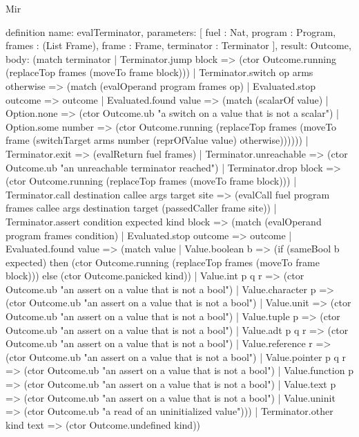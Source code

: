 \begin{lexlean}{Mir}
\begin{semanticmodule}
definition{
  name: evalTerminator,
  parameters: [
    fuel : Nat,
    program : Program,
    frames : (List Frame),
    frame : Frame,
    terminator : Terminator
  ],
  result: Outcome,
  body: (match terminator
    | Terminator.jump block => (ctor Outcome.running (replaceTop frames (moveTo frame block)))
    | Terminator.switch op arms otherwise => (match (evalOperand program frames op)
      | Evaluated.stop outcome => outcome
      | Evaluated.found value => (match (scalarOf value)
        | Option.none => (ctor Outcome.ub "a switch on a value that is not a scalar")
        | Option.some number => (ctor Outcome.running (replaceTop frames (moveTo frame (switchTarget arms number (reprOfValue value) otherwise))))))
    | Terminator.exit => (evalReturn fuel frames)
    | Terminator.unreachable => (ctor Outcome.ub "an unreachable terminator reached")
    | Terminator.drop block => (ctor Outcome.running (replaceTop frames (moveTo frame block)))
    | Terminator.call destination callee args target site => (evalCall fuel program frames callee args destination target (passedCaller frame site))
    | Terminator.assert condition expected kind block => (match (evalOperand program frames condition)
      | Evaluated.stop outcome => outcome
      | Evaluated.found value => (match value
        | Value.boolean b => (if (sameBool b expected) then (ctor Outcome.running (replaceTop frames (moveTo frame block))) else (ctor Outcome.panicked kind))
        | Value.int p q r => (ctor Outcome.ub "an assert on a value that is not a bool")
        | Value.character p => (ctor Outcome.ub "an assert on a value that is not a bool")
        | Value.unit => (ctor Outcome.ub "an assert on a value that is not a bool")
        | Value.tuple p => (ctor Outcome.ub "an assert on a value that is not a bool")
        | Value.adt p q r => (ctor Outcome.ub "an assert on a value that is not a bool")
        | Value.reference r => (ctor Outcome.ub "an assert on a value that is not a bool")
        | Value.pointer p q r => (ctor Outcome.ub "an assert on a value that is not a bool")
        | Value.function p => (ctor Outcome.ub "an assert on a value that is not a bool")
        | Value.text p => (ctor Outcome.ub "an assert on a value that is not a bool")
        | Value.uninit => (ctor Outcome.ub "a read of an uninitialized value")))
    | Terminator.other kind text => (ctor Outcome.undefined kind))
}


\end{semanticmodule}
\end{lexlean}
